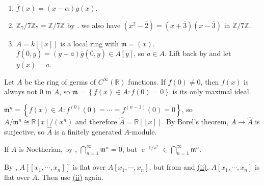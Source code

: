 \begin{exercise}\label{ex10.10}
	\begin{enumerate}[label=(\roman*),ref=\theexercise(\roman*)]
		\item $\overline{f}(x)=(x-\alpha)\overline{g}(x)$.
		\item $\mathbb{Z}_7/7\mathbb{Z}_7=\mathbb{Z}/7\mathbb{Z}$ by . we also have $\left(x^2-\overline{2}\right)=(x+\overline{3})(x-\overline{3})$ in $\mathbb{Z}/7\mathbb{Z}$.
		\item $A=k[[x]]$ is a local ring with $\mathfrak{m}=(x)$. $\overline{f}(\overline{0},y)=(y-\overline{a})\overline{g}(\overline{0},y)\in A[y]$, so $a\in A$. Lift back by  and let $y(x)=a$.
	\end{enumerate}
\end{exercise}

\begin{exercise}\label{ex10.11}
	Let $A$ be the ring of germs of $C^\infty(\mathbb{R})$ functions. If $f(0)\neq0$, then $f(x)$ is always not 0 in $A$, so $\mathfrak{m}=\left\{f(x)\in A:f(0)=0\right\}$ is its only maximal ideal.
	
	$\mathfrak{m}^n=\left\{f(x)\in A:f^{(0)}(0)=\cdots=f^{(n-1)}(0)=0\right\}$, so $A/\mathfrak{m}^n\cong\mathbb{R}[x]/\left(x^n\right)$ and therefore $\hat{A}=\mathbb{R}[[x]]$. By Borel's theorem, $A\rightarrow\hat{A}$ is surjective, so $\hat{A}$ is a finitely generated $A$-module.
	
	If $A$ is Noetherian, by , $\bigcap_{n=1}^\infty\mathfrak{m}^n=0$, but $\operatorname{e}^{-1/x^2}\in\bigcap_{n=1}^\infty\mathfrak{m}^n$.
\end{exercise}

\begin{exercise}\label{ex10.12}
	By , $A[[x_1,\cdots,x_n]]$ is flat over $A[x_1,\cdots,x_n]$, but from  and \hyperref[ex2.8]{(ii)}, $A[x_1,\cdots,x_n]$ is flat over $A$. Then use \hyperref[ex2.8]{(ii)} again.
\end{exercise}